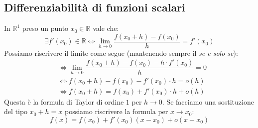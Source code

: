 \subsection{Differenziabilità di funzioni scalari}
In $\mathbb{R}^1$ preso un punto $x_0 \in \mathbb{R}$ vale che:
\begin{equation*}
	\exists f'(x_0) \in \mathbb{R} \iff \lim_{h \to 0} \dfrac{f(x_0 + h) - f(x_0)}{h} = f'(x_0)
\end{equation*}
Possiamo riscrivere il limite come segue (mantenendo sempre il \textit{se e solo se}):
\begin{align*}
	&\iff \lim_{h \to 0} \dfrac{f(x_0 + h) - f(x_0) - h \cdot f'(x_0)}{h} = 0\\[5pt]
	&\iff f(x_0 + h) - f(x_0) - f'(x_0) \cdot h = o(h)\\[5pt]
	&\iff f(x_0 + h) = f(x_0) + f'(x_0) \cdot h + o(h)
\end{align*}
Questa è la formula di Taylor di ordine $1$ per $h \to 0$. Se facciamo una sostituzione del tipo $x_0 + h = x$ possiamo riscrivere la formula per $x \to x_0$:
\begin{equation*}
	f(x) = f(x_0) + f'(x_0) (x - x_0) + o(x - x_0)
\end{equation*}

